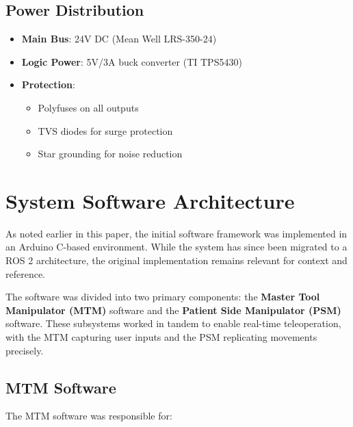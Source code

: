 \subsection{Power Distribution}
\begin{itemize}
    \item \textbf{Main Bus}: 24V DC (Mean Well LRS-350-24)
    \item \textbf{Logic Power}: 5V/3A buck converter (TI TPS5430)
    \item \textbf{Protection}:
    \begin{itemize}
        \item Polyfuses on all outputs
        \item TVS diodes for surge protection
        \item Star grounding for noise reduction
    \end{itemize}
\end{itemize}

\section{System Software Architecture}
\label{sec:software_architecture}

As noted earlier in this paper, the initial software framework was implemented in an Arduino C-based environment. While the system has since been migrated to a ROS 2 architecture, the original implementation remains relevant for context and reference.

The software was divided into two primary components: the \textbf{Master Tool Manipulator (MTM)} software and the \textbf{Patient Side Manipulator (PSM)} software. These subsystems worked in tandem to enable real-time teleoperation, with the MTM capturing user inputs and the PSM replicating movements precisely.

\subsection{MTM Software}
The MTM software was responsible for:

